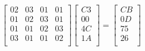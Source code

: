 \[
  \begin{bmatrix}
    02 & 03 & 01 & 01 \\
    01 & 02 & 03 & 01 \\
    01 & 01 & 02 & 03 \\
    03 & 01 & 01 & 02 \\
  \end{bmatrix}
  \begin{bmatrix}
    C3 \\
    00 \\
    4C \\
    1A \\
  \end{bmatrix}
  =
  \begin{bmatrix}
    CB \\
    0D \\
    75 \\
    26 \\
  \end{bmatrix}
\]
